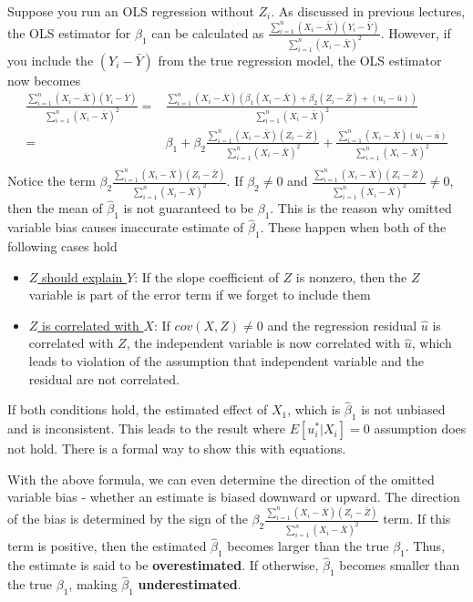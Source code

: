 Suppose you run an OLS regression without $Z_i$. As discussed in previous lectures, the OLS estimator for $\beta_1$ can be calculated as $\frac{\sum_{i=1}^n(X_i-\bar{X})(Y_i-\bar{Y})}{\sum_{i=1}^n(X_i-\bar{X})^2}$. However, if you include the $(Y_i-\bar{Y})$ from the true regression model, the OLS estimator now becomes
\[
\begin{aligned}
\frac{\sum_{i=1}^n(X_i-\bar{X})(Y_i-\bar{Y})}{\sum_{i=1}^n(X_i-\bar{X})^2} =& \frac{\sum_{i=1}^n(X_i-\bar{X})(\beta_1(X_i-\bar{X})+\beta_2(Z_i-\bar{Z})+(u_i-\bar{u}))}{\sum_{i=1}^n(X_i-\bar{X})^2}\\
=& \beta_1 + \beta_2\frac{\sum_{i=1}^n(X_i-\bar{X})(Z_i-\bar{Z})}{\sum_{i=1}^n(X_i-\bar{X})^2}+\frac{\sum_{i=1}^n(X_i-\bar{X})(u_i-\bar{u})}{\sum_{i=1}^n(X_i-\bar{X})^2}\\
\end{aligned}
\]
Notice the term $\beta_2\frac{\sum_{i=1}^n(X_i-\bar{X})(Z_i-\bar{Z})}{\sum_{i=1}^n(X_i-\bar{X})^2}$. If $\beta_2 \neq0$ and $\frac{\sum_{i=1}^n(X_i-\bar{X})(Z_i-\bar{Z})}{\sum_{i=1}^n(X_i-\bar{X})^2}\neq 0$, then the mean of $\hat{\beta}_1$ is not guaranteed to be $\beta_1$. This is the reason why omitted variable bias causes inaccurate estimate of $\hat{\beta}_1$. These happen when both of the following cases hold
\begin{itemize}
\item \underline{$Z$ should explain $Y$}: If the slope coefficient of $Z$ is nonzero, then the $Z$ variable is part of the error term if we forget to include them
\item \underline{$Z$ is correlated with $X$}: If $cov(X,Z)\neq0$ and the regression residual $\hat{u}$ is correlated with $Z$, the independent variable is now correlated with $\hat{u}$, which leads to violation of the assumption that independent variable and the residual are not correlated.
\end{itemize} \par\medskip
If both conditions hold, the estimated effect of $X_1$, which is $\hat{\beta}_1$ is not unbiased and is inconsistent. This leads to the result where $E[u^*_i|X_i]=0$ assumption does not hold. There is a formal way to show this with equations.
\par\medskip
With the above formula, we can even determine the direction of the omitted variable bias - whether an estimate is biased downward or upward. The direction of the bias is determined by the sign of the $\beta_2\frac{\sum_{i=1}^n(X_i-\bar{X})(Z_i-\bar{Z})}{\sum_{i=1}^n(X_i-\bar{X})^2}$ term. If this term is positive, then the estimated $\hat{\beta}_1$ becomes larger than the true $\beta_1$. Thus, the estimate is said to be \textbf{overestimated}. If otherwise, $\hat{\beta}_1$ becomes smaller than the true $\beta_1$, making $\hat{\beta}_1$ \textbf{underestimated}.
